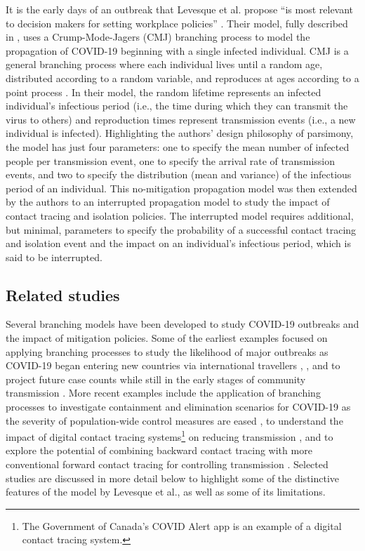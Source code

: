 \documentclass[sr]{drdc-report}
\begin{document}
It is the early days of an outbreak that Levesque et al. propose “is most relevant to decision makers for setting workplace policies” \cite{LevesquePaper}. Their model, fully described in \cite{LevesquePaper}, uses a Crump-Mode-Jagers (CMJ) branching process to model the propagation of COVID-19 beginning with a single infected individual. CMJ is a general branching process where each individual lives until a random age, distributed according to a random variable, and reproduces at ages according to a point process \cite{Ball}. In their model, the random lifetime represents an infected individual’s infectious period (i.e., the time during which they can transmit the virus to others) and reproduction times represent transmission events (i.e., a new individual is infected). Highlighting the authors’ design philosophy of parsimony, the model has just four parameters: one to specify the mean number of infected people per transmission event, one to specify the arrival rate of transmission events, and two to specify the distribution (mean and variance) of the infectious period of an individual. This no-mitigation propagation model was then extended by the authors to an interrupted propagation model to study the impact of contact tracing and isolation policies. The interrupted model requires additional, but minimal, parameters to specify the probability of a successful contact tracing and isolation event and the impact on an individual’s infectious period, which is said to be interrupted.  

 

\subsection{Related studies} 

 

Several branching models have been developed to study COVID-19 outbreaks and the impact of mitigation policies. Some of the earliest examples focused on applying branching processes to study the likelihood of major outbreaks as COVID-19 began entering new countries via international travellers \cite{Boldog}, \cite{Hellewell}, \cite{Kucharski} and to project future case counts while still in the early stages of community transmission \cite{Pearson}. More recent examples include the application of branching processes to investigate containment and elimination scenarios for COVID-19 as the severity of population-wide control measures are eased \cite{Aotearoa}, to understand the impact of digital contact tracing systems{\footnote{The Government of Canada’s COVID Alert app \cite{alert} is an example of a digital contact tracing system.}} on reducing transmission \cite{PlankDigital}, and to explore the potential of combining backward contact tracing{\footnotemark} with more conventional forward contact tracing for controlling transmission \cite{Endo}. Selected studies are discussed in more detail below to highlight some of the distinctive features of the model by Levesque et al., as well as some of its limitations. 
\end{document}

